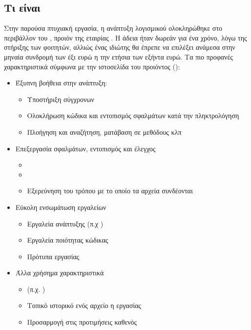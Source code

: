 \subsection*{Τι είναι}
\quad Στην παρούσα πτυχιακή εργασία, η ανάπτυξη λογισμικού ολοκληρώθηκε στο περιβάλλον του , προιόν της εταιρίας . Η άδεια ήταν δωρεάν για ένα χρόνο, λόγω της στήριξης των φοιτητών, αλλιώς ένας ιδιώτης θα έπρεπε να επιλέξει ανάμεσα στην μηναία συνδρομή των έξι ευρώ η την ετήσια των εξήντα ευρώ.\newline
\quad Τα πιο προφανές χαρακτηριστικά σύμφωνα με την ιστοσελίδα του προιόντος ():
\begin{itemize}
    \item Έξυπνη βοήθεια στην ανάπτυξη:
        \begin{itemize}
            \item Υποστήριξη σύγχρονων 
            \item Ολοκλήρωση κώδικα και εντοπισμός σφαλμάτων κατά την πληκτρολόγηση
            \item Πλοήγηση και αναζήτηση, ματάβαση σε μεθόδους κλπ
        \end{itemize}
    \item Επεξεργασία σφαλμάτων, εντοπισμός και έλεγχος
        \begin{itemize}
            \item {}
            \item {}
            \item Εξερεύνηση του τρόπου με το οποίο τα αρχεία συνδέονται
        \end{itemize}
    \item Εύκολη ενσωμάτωση εργαλείων
        \begin{itemize}
            \item Εργαλεία ανάπτυξης (π.χ )
            \item Εργαλεία ποιότητας κώδικας
            \item Πρότυπα εργασίας
        \end{itemize}
    \item Άλλα χρήσημα χαρακτηριστικά
        \begin{itemize}
            \item {} (π.χ. )
            \item Τοπικό ιστορικό ενός αρχείο η εργασίας
            \item Προσαρμογή στις προτιμήσεις καθενός
        \end{itemize}
\end{itemize}

